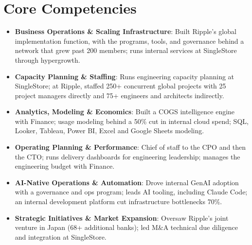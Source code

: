 \documentclass[11pt,letterpaper,sans]{moderncv}
\begin{document}
\section{Core Competencies}
\vspace{1pt}
\begin{itemize}

\item \textbf{Business Operations \& Scaling Infrastructure}: Built Ripple's global implementation function, with the programs, tools, and governance behind a network that grew past 200 members; runs internal services at SingleStore through hypergrowth.

\item \textbf{Capacity Planning \& Staffing}: Runs engineering capacity planning at SingleStore; at Ripple, staffed 250+ concurrent global projects with 25 project managers directly and 75+ engineers and architects indirectly.

\item \textbf{Analytics, Modeling \& Economics}: Built a COGS intelligence engine with Finance; usage modeling behind a 50\% cut in internal cloud spend; SQL, Looker, Tableau, Power BI, Excel and Google Sheets modeling.

\item \textbf{Operating Planning \& Performance}: Chief of staff to the CPO and then the CTO; runs delivery dashboards for engineering leadership; manages the engineering budget with Finance.

\item \textbf{AI-Native Operations \& Automation}: Drove internal GenAI adoption with a governance and ops program; leads AI tooling, including Claude Code; an internal development platform cut infrastructure bottlenecks 70\%.

\item \textbf{Strategic Initiatives \& Market Expansion}: Oversaw Ripple's joint venture in Japan (68+ additional banks); led M\&A technical due diligence and integration at SingleStore.

\end{itemize}

\end{document}
